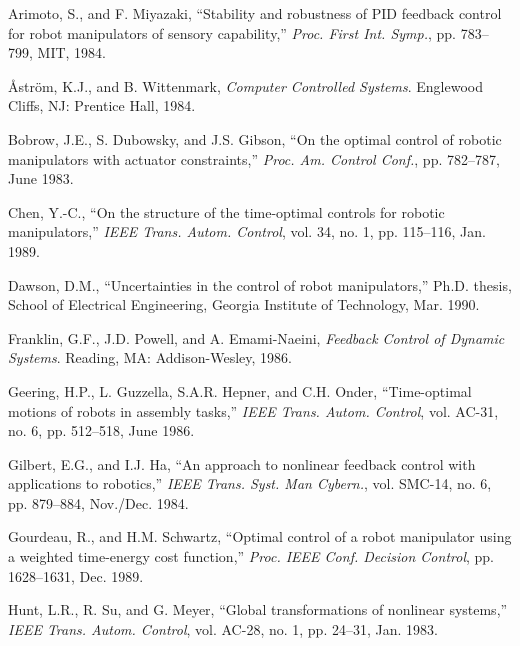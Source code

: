 \documentclass[UTF8]{ctexart}
\theoremstyle{definition}
\begin{document}
\begin{enumerate}[label={[\arabic*]}, leftmargin=*]
\item Arimoto, S., and F. Miyazaki, ``Stability and robustness of PID feedback control for robot manipulators of sensory capability,'' \textit{Proc. First Int. Symp.}, pp. 783--799, MIT, 1984.

\item Åström, K.J., and B. Wittenmark, \textit{Computer Controlled Systems}. Englewood Cliffs, NJ: Prentice Hall, 1984.

\item Bobrow, J.E., S. Dubowsky, and J.S. Gibson, ``On the optimal control of robotic manipulators with actuator constraints,'' \textit{Proc. Am. Control Conf.}, pp. 782--787, June 1983.

\item Chen, Y.-C., ``On the structure of the time-optimal controls for robotic manipulators,'' \textit{IEEE Trans. Autom. Control}, vol. 34, no. 1, pp. 115--116, Jan. 1989.

\item Dawson, D.M., ``Uncertainties in the control of robot manipulators,'' Ph.D. thesis, School of Electrical Engineering, Georgia Institute of Technology, Mar. 1990.

\item Franklin, G.F., J.D. Powell, and A. Emami-Naeini, \textit{Feedback Control of Dynamic Systems}. Reading, MA: Addison-Wesley, 1986.

\item Geering, H.P., L. Guzzella, S.A.R. Hepner, and C.H. Onder, ``Time-optimal motions of robots in assembly tasks,'' \textit{IEEE Trans. Autom. Control}, vol. AC-31, no. 6, pp. 512--518, June 1986.

\item Gilbert, E.G., and I.J. Ha, ``An approach to nonlinear feedback control with applications to robotics,'' \textit{IEEE Trans. Syst. Man Cybern.}, vol. SMC-14, no. 6, pp. 879--884, Nov./Dec. 1984.

\item Gourdeau, R., and H.M. Schwartz, ``Optimal control of a robot manipulator using a weighted time-energy cost function,'' \textit{Proc. IEEE Conf. Decision Control}, pp. 1628--1631, Dec. 1989.

\item Hunt, L.R., R. Su, and G. Meyer, ``Global transformations of nonlinear systems,'' \textit{IEEE Trans. Autom. Control}, vol. AC-28, no. 1, pp. 24--31, Jan. 1983.


\end{enumerate}
\end{document}
